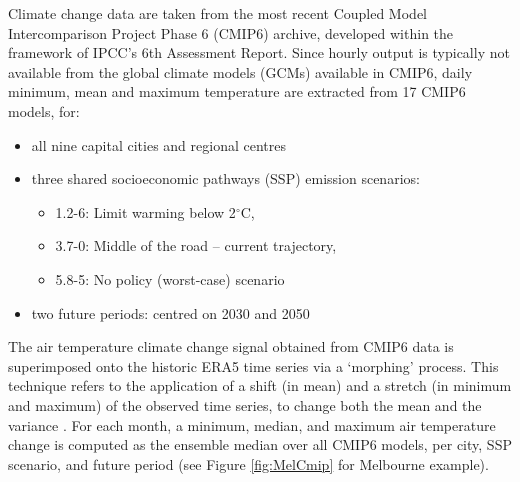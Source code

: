 \documentclass[final,3p,times,authoryear]{elsarticle}
\begin{document}
Climate change data are taken from the most recent Coupled Model Intercomparison Project Phase 6 \citep{Eyring2016} (CMIP6) archive, developed within the framework of IPCC's 6th Assessment Report\citep{IPCC2021}. Since hourly output is typically not available from the global climate models (GCMs) available in CMIP6, daily minimum, mean and maximum temperature are extracted from 17 CMIP6 models, for:

\begin{itemize}
\item all nine capital cities and regional centres
	\item three shared socioeconomic pathways (SSP) emission scenarios:
	\begin{itemize}
	\item 1.2-6: Limit warming below 2$^{\circ}$C, 
	\item 3.7-0: Middle of the road -- current trajectory, 
	\item 5.8-5: No policy (worst-case) scenario
	\end{itemize}
\item two future periods: centred on 2030 and 2050
\end{itemize}

The air temperature climate change signal obtained from CMIP6 data is superimposed onto the historic ERA5 time series via a `morphing' process. This technique refers to the application of a shift (in mean) and a stretch (in minimum and maximum) of the observed time series, to change both the mean and the variance \citep{Belcher2005,Pulkkinen2021}. For each month, a minimum, median, and maximum air temperature change is computed as the ensemble median over all CMIP6 models, per city, SSP scenario, and future period (see Figure \ref{fig:MelCmip} for Melbourne example). 
\end{document}
